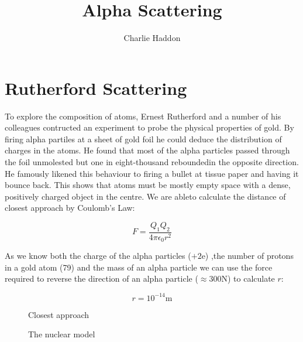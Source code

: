 \documentclass[a4,8pt]{article}
\title{Alpha Scattering}
\author{Charlie Haddon}
\begin{document}
\begin{titlepage}
	\pagenumbering{}
	\maketitle
	\vspace{15cm}
\end{titlepage}
\clearpage



\section{Rutherford Scattering}
To explore the composition of atoms, Ernest Rutherford and a number of his colleagues contructed an experiment to probe the physical properties of gold. By firing alpha partiles at a sheet of gold foil he could deduce the distribution of charges in the atoms. He found that most of the alpha particles passed through the foil unmolested but one in eight-thousand reboundedin the opposite direction. He famously likened this behaviour to firing a bullet at tissue paper and having it bounce back. This shows that atoms must be mostly empty space with a dense, positively charged object in the centre. We are ableto calculate the distance of closest approach by Coulomb's Law:

$$F = \frac{Q_1 Q_2}{4\pi \epsilon _0 r^2}$$ 

As we know both the charge of the alpha particles ($+2\text{e}$) ,the number of protons in a gold atom (79) and the mass of an alpha particle we can use the force required to reverse the direction of an alpha particle ($\approx300\si\newton$) to calculate $r$:

$$r = 10^{-14} \si\meter$$ 

\begin{figure}[H]
\begin{center}
\begin{tikzpicture}
\end{tikzpicture}
\caption{Closest approach}
\end{center}
\end{figure}

\begin{figure}[H]
\begin{center}
\caption{The nuclear model}
\end{center}
\end{figure}
\end{document}
